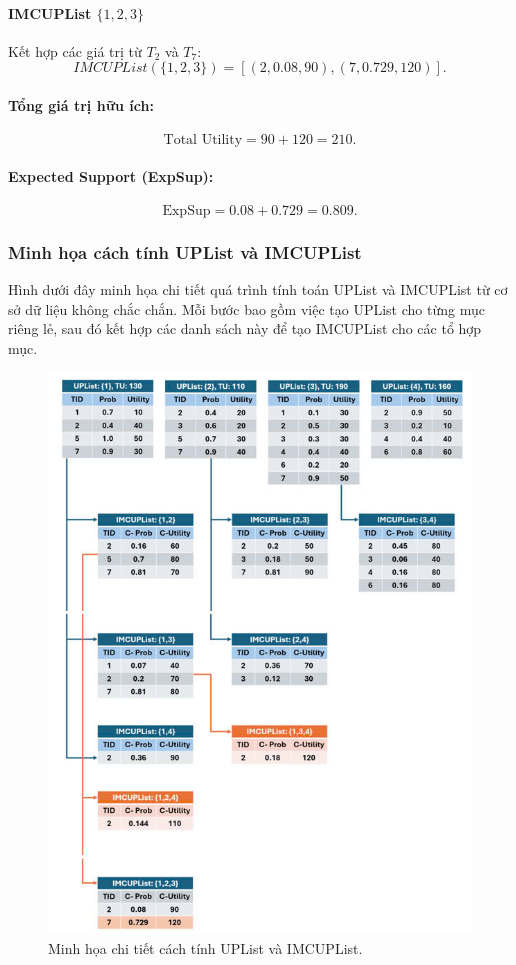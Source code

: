 \documentclass[conference]{IEEEtran}
\begin{document}
\paragraph{IMCUPList \(\{1, 2, 3\}\)}
Kết hợp các giá trị từ \(T_2\) và \(T_7\):
\[
IMCUPList(\{1,2,3\}) = [(2, 0.08, 90), (7, 0.729, 120)].
\]

\paragraph{Tổng giá trị hữu ích:}
\[
\text{Total Utility} = 90 + 120 = 210.
\]

\paragraph{Expected Support (ExpSup):}
\[
\text{ExpSup} = 0.08 + 0.729 = 0.809.
\]

\subsubsection{Minh họa cách tính UPList và IMCUPList}

Hình dưới đây minh họa chi tiết quá trình tính toán UPList và IMCUPList từ cơ sở dữ liệu không chắc chắn. Mỗi bước bao gồm việc tạo UPList cho từng mục riêng lẻ, sau đó kết hợp các danh sách này để tạo IMCUPList cho các tổ hợp mục.

\begin{figure}[H]
    \centering
    \includegraphics[width=\columnwidth]{UPList_IMCUPList.jpg} %
    \caption{Minh họa chi tiết cách tính UPList và IMCUPList.}
    \label{fig:uplist_imcuplist}
\end{figure}
\end{document}
